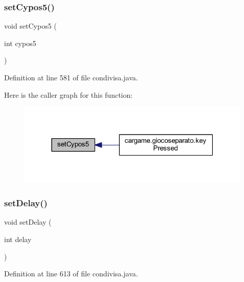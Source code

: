 \subsubsection{\texorpdfstring{set\+Cypos5()}{setCypos5()}}
{\footnotesize\ttfamily void set\+Cypos5 (\begin{DoxyParamCaption}\item[{int}]{cypos5 }\end{DoxyParamCaption})}



Definition at line 581 of file condivisa.\+java.

Here is the caller graph for this function\+:
\nopagebreak
\begin{figure}[H]
\begin{center}
\leavevmode
\includegraphics[width=316pt]{classcargame_1_1condivisa_ae1e077b4b6da22211fc4e93d5806a095_icgraph}
\end{center}
\end{figure}
\mbox{\label{classcargame_1_1condivisa_a511f425b438de1dfc7952baa3422e055}} 
\subsubsection{\texorpdfstring{set\+Delay()}{setDelay()}}
{\footnotesize\ttfamily void set\+Delay (\begin{DoxyParamCaption}\item[{int}]{delay }\end{DoxyParamCaption})}



Definition at line 613 of file condivisa.\+java.


